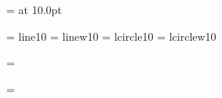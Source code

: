  \font\tenex   = \mathexname at 10.0pt

\font\tenln    = line10
\font\tenlnw   = linew10
\font\tencirc  = lcircle10    %
\font\tencircw = lcirclew10   %

%
\ifnum{}\tenln=\tencirc \else
  \immediate{}\fi
\ifnum{}\tenlnw=\tencircw \else
  \immediate{}\fi


\def\rm{\protect\prm}
\def\it{\protect\pit}
\def\bf{\protect\pbf}
\def\sl{\protect\psl}
\def\sf{\protect\psf}
\def\sc{\protect\psc}
\def\tt{\protect\ptt}

\def\@mbi{cmmib10}
\def\@mbsy{cmbsy10}
\def\@mcsc{cmcsc10}
\def\@mss{\sansname at 10.0pt}
\def\@lasyb{lasyb10}


\newfam\itfam      %
\newfam\slfam      %
\newfam\bffam      %
\newfam\ttfam      %
\newfam\sffam      %
\newfam\scfam      %
\newfam\lyfam      %

\def\cal{\fam\tw@}
\def\mit{\fam\@ne}

\def\@setstrut{\setbox\strutbox=\hbox{\vrule \@height .7\baselineskip
    \@depth .3\baselineskip \@width\z@}}



